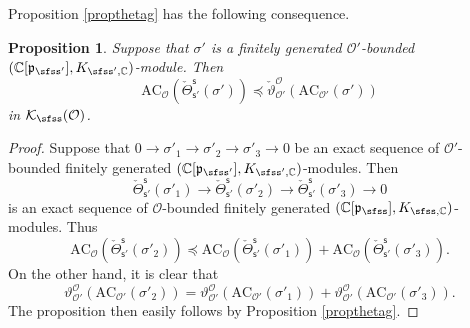 \documentclass[12pt,a4paper]{amsart}
\newcommand{\CK}{{\mathcal {K}}}
\newcommand{\CO}{{\mathcal {O}}}
\newcommand{\p}{\mathfrak p}
\numberwithin{equation}{section}
\newtheorem{prop}[thm]{Proposition}
\theoremstyle{remark}
\begin{document}
Proposition \ref{propthetag} has the following consequence.
\begin{prop}\label{propthetag2}
Suppose that $\sigma'$ is a finitely generated $\CO'$-bounded $(\C[\p_{\sfss'}], K_{\sfss', \C})$-module. Then
\[
\mathrm{AC}_{\CO}( \check \Theta_{\mathsf s'}^{\mathsf s}(\sigma'))\preceq  \check \vartheta_{\CO'}^{\CO}(\mathrm{AC}_{\CO'}(\sigma'))
\]
in $\CK_\sfss(\CO)$.

\end{prop}
\begin{proof}
Suppose that  $0\rightarrow \sigma'_1\rightarrow \sigma'_2\rightarrow \sigma'_3\rightarrow 0$ be an exact sequence of  $\CO'$-bounded finitely generated $(\C[\p_{\sfss'}], K_{\sfss', \C})$-modules. Then
\[
 \check \Theta_{\mathsf s'}^{\mathsf s}(\sigma'_1)\rightarrow \check \Theta_{\mathsf s'}^{\mathsf s}(\sigma'_2)\rightarrow \check \Theta_{\mathsf s'}^{\mathsf s}(\sigma'_3)\rightarrow 0
 \]
 is  an exact sequence of  $\CO$-bounded finitely generated $(\C[\p_{\sfss}], K_{\sfss, \C})$-modules.
Thus
 \[
   \mathrm{AC}_{\CO}( \check \Theta_{\mathsf s'}^{\mathsf s}(\sigma'_2))\preceq \mathrm{AC}_{\CO}( \check \Theta_{\mathsf s'}^{\mathsf s}(\sigma'_1))+\mathrm{AC}_{\CO}( \check \Theta_{\mathsf s'}^{\mathsf s}(\sigma'_3)).
 \]
 On the other hand, it is clear that
  \[
  \vartheta_{\CO'}^{\CO}(\mathrm{AC}_{\CO'}(\sigma'_2))= \vartheta_{\CO'}^{\CO}(\mathrm{AC}_{\CO'}(\sigma'_1))+ \vartheta_{\CO'}^{\CO}(\mathrm{AC}_{\CO'}(\sigma'_3)).
  \]
The proposition then easily follows by Proposition \ref{propthetag}.
\end{proof}
\end{document}

